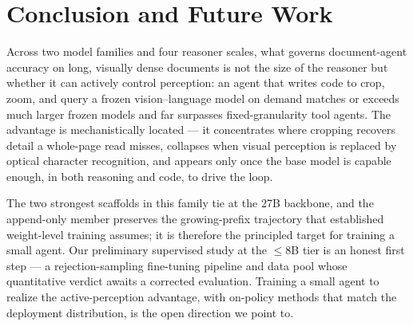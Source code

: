 \section{Conclusion and Future Work}
\label{sec:conclusion}

Across two model families and four reasoner scales, what governs document-agent accuracy on long, visually dense documents is not the size of the reasoner but whether it can actively control perception: an agent that writes code to crop, zoom, and query a frozen vision--language model on demand matches or exceeds much larger frozen models and far surpasses fixed-granularity tool agents. The advantage is mechanistically located --- it concentrates where cropping recovers detail a whole-page read misses, collapses when visual perception is replaced by optical character recognition, and appears only once the base model is capable enough, in both reasoning and code, to drive the loop.

The two strongest scaffolds in this family tie at the 27B backbone, and the append-only member preserves the growing-prefix trajectory that established weight-level training assumes; it is therefore the principled target for training a small agent. Our preliminary supervised study at the $\leq$8B tier is an honest first step --- a rejection-sampling fine-tuning pipeline and data pool whose quantitative verdict awaits a corrected evaluation. Training a small agent to realize the active-perception advantage, with on-policy methods that match the deployment distribution, is the open direction we point to.
